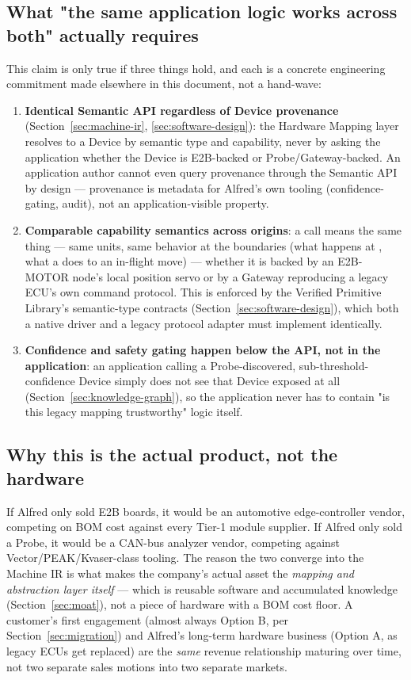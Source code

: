 \subsection{What "the same application logic works across both" actually requires}

This claim is only true if three things hold, and each is a concrete engineering commitment made elsewhere in this document, not a hand-wave:

\begin{enumerate}
\item \textbf{Identical Semantic API regardless of Device provenance} (Section~\ref{sec:machine-ir}, \ref{sec:software-design}): the Hardware Mapping layer resolves  to a Device by semantic type and capability, never by asking the application whether the Device is E2B-backed or Probe/Gateway-backed. An application author cannot even query provenance through the Semantic API by design --- provenance is metadata for Alfred's own tooling (confidence-gating, audit), not an application-visible property.
\item \textbf{Comparable capability semantics across origins}: a  call means the same thing --- same units, same behavior at the boundaries (what happens at , what a  does to an in-flight move) --- whether it is backed by an E2B-MOTOR node's local position servo or by a Gateway reproducing a legacy ECU's own command protocol. This is enforced by the Verified Primitive Library's semantic-type contracts (Section~\ref{sec:software-design}), which both a native driver and a legacy protocol adapter must implement identically.
\item \textbf{Confidence and safety gating happen below the API, not in the application}: an application calling a Probe-discovered, sub-threshold-confidence Device simply does not see that Device exposed at all (Section~\ref{sec:knowledge-graph}), so the application never has to contain "is this legacy mapping trustworthy" logic itself.
\end{enumerate}

\subsection{Why this is the actual product, not the hardware}

If Alfred only sold E2B boards, it would be an automotive edge-controller vendor, competing on BOM cost against every Tier-1 module supplier. If Alfred only sold a Probe, it would be a CAN-bus analyzer vendor, competing against Vector/PEAK/Kvaser-class tooling. The reason the two converge into the Machine IR is what makes the company's actual asset the \emph{mapping and abstraction layer itself} --- which is reusable software and accumulated knowledge (Section~\ref{sec:moat}), not a piece of hardware with a BOM cost floor. A customer's first engagement (almost always Option B, per Section~\ref{sec:migration}) and Alfred's long-term hardware business (Option A, as legacy ECUs get replaced) are the \emph{same} revenue relationship maturing over time, not two separate sales motions into two separate markets.
